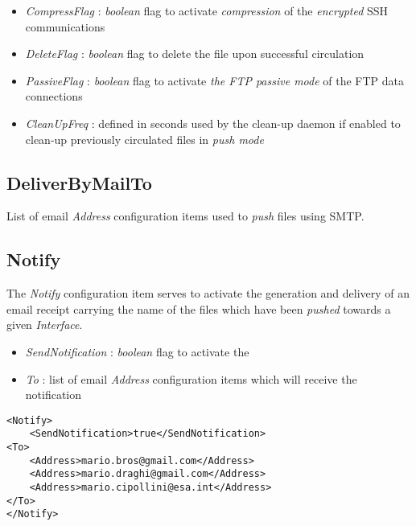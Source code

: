 \documentclass[dec_sum_main.tex]{subfiles}
\begin{document}
\begin{itemize}
	\item \textit{CompressFlag} : \textit{boolean} flag to activate \textit{compression} of the \textit{encrypted} SSH communications
	\label{DeleteFlag}
	\item \textit{DeleteFlag} : \textit{boolean} flag to delete the file upon successful circulation
    \label{PassiveFlag}
	\item \textit{PassiveFlag} : \textit{boolean} flag to activate \textit{the FTP passive mode} of the FTP data connections
	\item \textit{CleanUpFreq} : defined in seconds used by the clean-up daemon if enabled to clean-up previously circulated files in \textit{push mode}	
\end{itemize}

\subsection{DeliverByMailTo}
List of email \textit{Address} configuration items used to \textit{push} files using SMTP.

 \label{EmailNotification}
\subsection{Notify}
The \textit{Notify} configuration item serves to activate the generation and delivery of an email receipt carrying the name of the files which have been \textit{pushed} towards a given \textit{Interface}.
\begin{itemize}
    \label{SendNotification}
	\item \textit{SendNotification} : \textit{boolean} flag to activate the 
	\item \textit{To} : list of email \textit{Address} configuration items which will receive the notification
\end{itemize}

\begin{lstlisting}
<Notify>
	<SendNotification>true</SendNotification>
<To>
	<Address>mario.bros@gmail.com</Address>
	<Address>mario.draghi@gmail.com</Address>
	<Address>mario.cipollini@esa.int</Address>
</To>
</Notify>
\end{lstlisting}

\label{Events}
\end{document}
